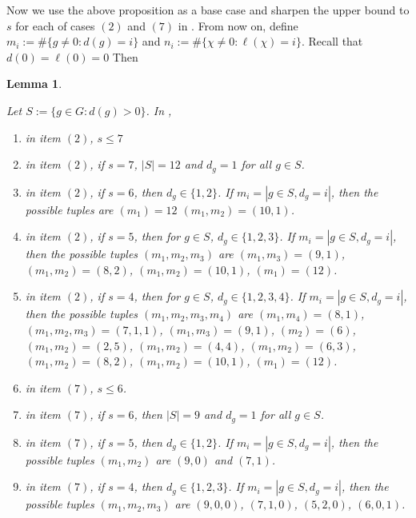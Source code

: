 \documentclass[12pt,twoside,]{amsart}
\theoremstyle{plain}
\newtheorem{lemma}[theorem]{Lemma}
\theoremstyle{definition}
\begin{document}
Now we use the above proposition as a base case and sharpen the upper bound to $s$ for each of cases $(2)$ and $(7)$ in . From now on, define $m_i:=\#\{g\neq 0:d(g)=i\}$ and $n_i:=\#\{\chi\neq 0:\ell(\chi)=i\}$. Recall that $d(0) = \ell(0) = 0$
Then

\begin{lemma}\label{divisor counts in list of cases}

Let $S:=\{g\in G : d(g)>0\}$. In ,

\begin{enumerate}
    \item in item $(2)$, $s \leq 7$
    \item in item $(2)$, if $s = 7$, $|S| = 12$ and $d_g = 1$ for all $g \in S$.
    \item in item $(2)$, if $s = 6$, then $d_g \in \{1, 2\}$. If $m_i = | g \in S, d_g = i|$, then the possible tuples are $(m_1) = 12$ $(m_1, m_2) = (10, 1)$.
    \item in item $(2)$, if $s = 5$, then for $g \in S$, $d_g \in \{1,2,3\}$. If $m_i = | g \in S, d_g = i|$, then the possible tuples $(m_1, m_2, m_3)$ are $(m_1, m_3) = (9,1)$, $(m_1, m_2) = (8,2)$, $(m_1, m_2) = (10,1)$, $(m_1) = (12)$.
    \item in item $(2)$, if $s = 4$, then for $g \in S$, $d_g \in \{1,2,3, 4\}$. If $m_i = | g \in S, d_g = i|$, then the possible tuples $(m_1, m_2, m_3, m_4)$ are $(m_1, m_4)= (8,1)$, $(m_1,m_2,m_3) = (7,1,1)$, $(m_1,m_3) = (9,1)$, $(m_2) = (6)$, $(m_1, m_2) = (2,5)$, $(m_1, m_2) = (4,4)$, $(m_1, m_2) = (6,3)$, $(m_1, m_2) = (8,2)$, $(m_1, m_2) = (10,1)$, $(m_1) = (12)$.

    
    \item in item $(7)$, $s \leq 6$.
    \item in item $(7)$, if $s = 6$, then $|S| = 9$ and $d_g = 1$ for all $g \in S$.
    \item in item $(7)$, if $s = 5$, then $d_g \in \{1, 2\}$. If $m_i = | g \in S, d_g = i|$, then the possible tuples $(m_1, m_2)$ are $(9,0)$ and $(7,1)$.
    \item in item $(7)$, if $s = 4$, then $d_g \in \{1, 2, 3\}$. If $m_i = | g \in S, d_g = i|$, then the possible tuples $(m_1, m_2, m_3)$ are $(9,0,0)$, $(7,1,0)$, $(5,2,0)$, $(6,0,1)$.
    
\end{enumerate}

    
\end{lemma}
\end{document}
